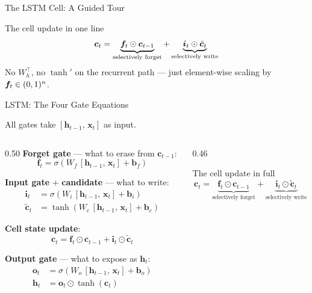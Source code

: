 \documentclass[aspectratio=169]{beamer}
\begin{document}
%
%
\begin{frame}{The LSTM Cell: A Guided Tour}

\begin{alertblock}{The cell update in one line}
\[
\bm{c}_t
  = \underbrace{\bm{f}_t \odot \bm{c}_{t-1}}_{\text{selectively forget}}
  + \underbrace{\bm{i}_t \odot \tilde{\bm{c}}_t}_{\text{selectively write}}
\]
No $W_h^\top$, no $\tanh'$ on the recurrent path --- just
element-wise scaling by $\bm{f}_t \in (0,1)^n$.
\end{alertblock}

\end{frame}
%
%
\begin{frame}{LSTM: The Four Gate Equations}

All gates take $[\bm{h}_{t-1},\, \bm{x}_t]$ as input.

\vspace{0.1cm}
\begin{columns}[T]
\begin{column}{0.50\textwidth}
\footnotesize
{\color{GateOrange}\textbf{Forget gate}} --- what to erase from $\bm{c}_{t-1}$:
\[
\bm{f}_t = \sigma(W_f\,[\bm{h}_{t-1},\,\bm{x}_t] + \bm{b}_f)
\]

{\color{Forest}\textbf{Input gate}} + \textbf{candidate} --- what to write:
\begin{align*}
\bm{i}_t       &= \sigma(W_i\,[\bm{h}_{t-1},\,\bm{x}_t] + \bm{b}_i) \\
\tilde{\bm{c}}_t &= \tanh(W_c\,[\bm{h}_{t-1},\,\bm{x}_t] + \bm{b}_c)
\end{align*}

{\color{CellGold}\textbf{Cell state update}}:
\[
\bm{c}_t = \bm{f}_t \odot \bm{c}_{t-1} + \bm{i}_t \odot \tilde{\bm{c}}_t
\]

{\color{CourseBlue}\textbf{Output gate}} --- what to expose as $\bm{h}_t$:
\begin{align*}
\bm{o}_t &= \sigma(W_o\,[\bm{h}_{t-1},\,\bm{x}_t] + \bm{b}_o) \\
\bm{h}_t &= \bm{o}_t \odot \tanh(\bm{c}_t)
\end{align*}

\end{column}
\begin{column}{0.46\textwidth}
\vspace{-.75cm}
\normalsize
\begin{block}{The cell update in full}
\[
\bm{c}_t
= \underbrace{\bm{f}_t \odot \bm{c}_{t-1}}_{\text{selectively forget}}
+ \underbrace{\bm{i}_t \odot \tilde{\bm{c}}_t}_{\text{selectively write}}
\]
\end{block}


\end{column}
\end{columns}
\end{frame}
\end{document}
